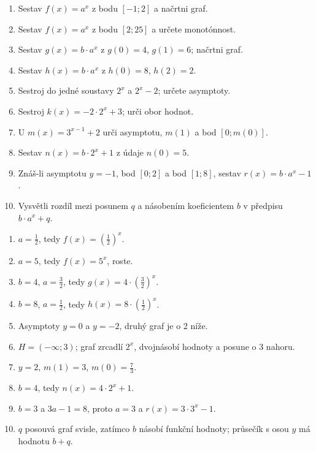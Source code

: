 \documentclass[11pt,a4paper]{article}
\begin{document}
\begin{zadaniReseniBox}[title={Domácí úkol}]
\begin{enumerate}[label=\alph*),itemsep=-1pt,topsep=0pt]
\item Sestav $f(x)=a^x$ z bodu $[-1;2]$ a načrtni graf.
\item Sestav $f(x)=a^x$ z bodu $[2;25]$ a určete monotónnost.
\item Sestav $g(x)=b\cdot a^x$ z $g(0)=4$, $g(1)=6$; načrtni graf.
\item Sestav $h(x)=b\cdot a^x$ z $h(0)=8$, $h(2)=2$.
\item Sestroj do jedné soustavy $2^x$ a $2^x-2$; určete asymptoty.
\item Sestroj $k(x)=-2\cdot2^x+3$; urči obor hodnot.
\item U $m(x)=3^{x-1}+2$ urči asymptotu, $m(1)$ a bod $[0;m(0)]$.
\item Sestav $n(x)=b\cdot2^x+1$ z údaje $n(0)=5$.
\item Znáš-li asymptotu $y=-1$, bod $[0;2]$ a bod $[1;8]$, sestav $r(x)=b\cdot a^x-1$.
\item Vysvětli rozdíl mezi posunem $q$ a násobením koeficientem $b$ v předpisu $b\cdot a^x+q$.
\end{enumerate}
\tcblower
\begin{enumerate}[label=\alph*),itemsep=-1pt,topsep=0pt]
\item $a=\frac{1}{2}$, tedy $f(x)=\left(\frac{1}{2}\right)^x$.
\item $a=5$, tedy $f(x)=5^x$, roste.
\item $b=4$, $a=\frac{3}{2}$, tedy $g(x)=4\cdot\left(\frac{3}{2}\right)^x$.
\item $b=8$, $a=\frac{1}{2}$, tedy $h(x)=8\cdot\left(\frac{1}{2}\right)^x$.
\item Asymptoty $y=0$ a $y=-2$, druhý graf je o 2 níže.
\item $H=(-\infty;3)$; graf zrcadlí $2^x$, dvojnásobí hodnoty a posune o 3 nahoru.
\item $y=2$, $m(1)=3$, $m(0)=\frac{7}{3}$.
\item $b=4$, tedy $n(x)=4\cdot2^x+1$.
\item $b=3$ a $3a-1=8$, proto $a=3$ a $r(x)=3\cdot3^x-1$.
\item $q$ posouvá graf svisle, zatímco $b$ násobí funkční hodnoty; průsečík s osou $y$ má hodnotu $b+q$.
\end{enumerate}
\end{zadaniReseniBox}
\end{document}
